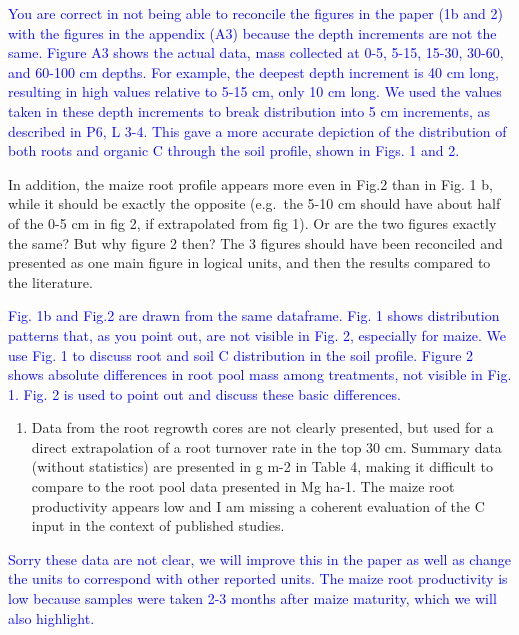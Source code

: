 \documentclass[]{article}
\providecommand{\tightlist}{%
  \setlength{\itemsep}{0pt}\setlength{\parskip}{0pt}}
\begin{document}
\textcolor{blue}{You are correct in not being able to reconcile the figures in the paper (1b and 2) with the figures in the appendix (A3) because the depth increments are not the same. Figure A3 shows the actual data, mass collected at 0-5, 5-15, 15-30, 30-60, and 60-100 cm depths. For example, the deepest depth increment is 40 cm long, resulting in high values relative to 5-15 cm, only 10 cm long. We used the values taken in these depth increments to break distribution into 5 cm increments, as described in P6, L 3-4. This gave a more accurate depiction of the distribution of both roots and organic C through the soil profile, shown in Figs. 1 and 2.}

In addition, the maize root profile appears more even in Fig.2 than in
Fig. 1 b, while it should be exactly the opposite (e.g.~the 5-10 cm
should have about half of the 0-5 cm in fig 2, if extrapolated from fig
1). Or are the two figures exactly the same? But why figure 2 then? The
3 figures should have been reconciled and presented as one main figure
in logical units, and then the results compared to the literature.

\textcolor{blue}{Fig. 1b and Fig.2 are drawn from the same dataframe. Fig. 1 shows distribution patterns that, as you point out, are not visible in Fig. 2, especially for maize. We use Fig. 1 to discuss root and soil C distribution in the soil profile. Figure 2 shows absolute differences in root pool mass among treatments, not visible in Fig. 1. Fig. 2 is used to point out and discuss these basic differences.}

\begin{enumerate}
\def\labelenumi{\arabic{enumi})}
\setcounter{enumi}{2}
\tightlist
\item
  Data from the root regrowth cores are not clearly presented, but used
  for a direct extrapolation of a root turnover rate in the top 30 cm.
  Summary data (without statistics) are presented in g m-2 in Table 4,
  making it difficult to compare to the root pool data presented in Mg
  ha-1. The maize root productivity appears low and I am missing a
  coherent evaluation of the C input in the context of published
  studies.
\end{enumerate}

\textcolor{blue}{Sorry these data are not clear, we will improve this in the paper as well as change the units to correspond with other reported units. The maize root productivity is low because samples were taken 2-3 months after maize maturity, which we will also highlight.}
\end{document}
